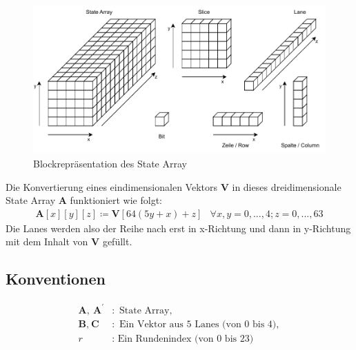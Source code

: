 \begin{figure}
	\center
	\includegraphics{images/StateArrayBeschreibung.pdf}
	\caption{Blockrepräsentation des State Array}
	\label{fig:statearray}
\end{figure}

Die Konvertierung eines eindimensionalen Vektors \textbf{V} in dieses dreidimensionale State Array \textbf{A} funktioniert wie folgt:
\begin{align*}
	\textbf{A}[x][y][z] \coloneq \textbf{V}[64(5y + x) + z] & \forall x,y = 0,...,4; z = 0,...,63
\end{align*}
Die Lanes werden also der Reihe nach erst in x-Richtung und dann in y-Richtung mit dem Inhalt von \textbf{V} gefüllt.

\subsection{Konventionen}
\begin{align*}
    \textbf{A},\ \textbf{A}^\prime & : \text{ State Array}, \\
    \textbf{B},\ \textbf{C} & : \text{ Ein Vektor aus 5 Lanes (von 0 bis 4)}, \\
    r & : \text{ Ein Rundenindex (von 0 bis 23)}
\end{align*}

